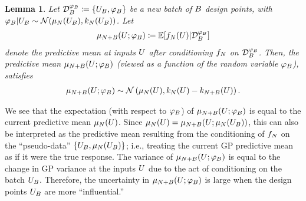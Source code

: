 \documentclass[12pt]{article}
\newtheorem{lemma}{Lemma}
\begin{document}
\begin{lemma} \label{lemma:pred-mean-dist}
Let $\designRand{\designBatchFunc} \Def \{\designBatchIn, \designBatchFunc\}$ be a new batch of $\Nbatch$ design points, with 
$\designBatchFunc | \designBatchIn \sim \Gaussian(\gpMean[\Ndesign](\designBatchIn), \gpKer[\Ndesign](\designBatchIn))$. 
Let  
\begin{align}
\gpMean[\Naugment](\parMat ; \designBatchFunc) 
\Def \E[\funcEm[\Ndesign](\parMat) | \designRand{\designBatchFunc}] \label{conditional-mean-notation}
\end{align}
denote the predictive mean at inputs $\parMat$ after conditioning $\funcEm[\Ndesign]$ on 
$\designRand{\designBatchFunc}$. Then, the predictive mean $\gpMean[\Naugment](\parMat; \designBatchFunc)$
(viewed as a function of the random variable $\designBatchFunc$), satisfies 
\begin{align}
\gpMean[\Naugment](\parMat ; \designBatchFunc)
\sim \Gaussian\left(\gpMean[\Ndesign](\parMat), 
                               \gpKer[\Ndesign](\parMat) - \gpKer[\Naugment](\parMat) \right) \label{pred-mean-dist}.
\end{align}
\end{lemma}
We see that the expectation (with respect to $\designBatchFunc$) of $\gpMean[\Naugment](\parMat ; \designBatchFunc)$ 
is equal to the current predictive mean $\gpMean[\Ndesign](\parMat)$. Since 
$\gpMean[\Ndesign](\parMat) = \gpMean[\Naugment](\parMat ; \gpMean[\Ndesign](\designBatchIn))$, this can also be 
interpreted as the predictive mean resulting from the conditioning of $\funcEm[\Ndesign]$ on the ``pseudo-data''
$\{\designBatchIn, \gpMean[\Ndesign](\designBatchIn)\}$; i.e., treating the current GP predictive mean as if it were 
the true response. The variance of 
$\gpMean[\Naugment](\parMat ; \designBatchFunc)$ is equal to the change in GP variance at the inputs $\parMat$ due to the act 
of conditioning on the batch $\designBatchIn$. Therefore, the uncertainty in $\gpMean[\Naugment](\parMat ; \designBatchFunc)$ 
is large when the design points $\designBatchIn$ are more ``influential.''
\end{document}
